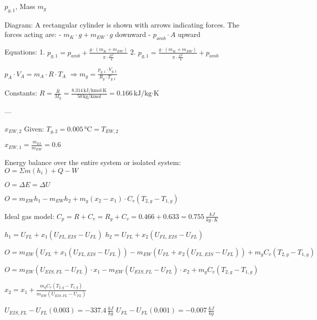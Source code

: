 \( p_{g,1} \), Mass \( m_g \)  

Diagram: A rectangular cylinder is shown with arrows indicating forces. The forces acting are:  
- \( m_K \cdot g + m_{EW} \cdot g \) downward  
- \( p_{amb} \cdot A \) upward  

Equations:  
1. \( p_{g,1} = p_{amb} + \frac{g \cdot (m_K + m_{EW})}{\pi \cdot \frac{D^2}{4}} \)  
2. \( p_{g,1} = \frac{g \cdot (m_K + m_{EW})}{\pi \cdot \frac{D^2}{4}} + p_{amb} \)  

\( p_A \cdot V_A = m_A \cdot R \cdot T_A \)  
\( \Rightarrow m_g = \frac{p_{g,1} \cdot V_{g,1}}{R_g \cdot T_{g,1}} \)  

Constants:  
\( R = \frac{\bar{R}}{M_g} = \frac{8.314 \, \text{kJ/kmol·K}}{50 \, \text{kg/kmol}} = 0.166 \, \text{kJ/kg·K} \)  

---

\( x_{EW,2} \)  
Given: \( T_{g,2} = 0.005 \, \text{°C} = T_{EW,2} \)  

\( x_{EW,1} = \frac{m_{EI}}{m_{EW}} = 0.6 \)  

Energy balance over the entire system or isolated system:  
\( O = \Sigma m (h_i) + Q - W \)  

\( O = \Delta E = \Delta U \)  

\( O = m_{EW} h_1 - m_{EW} h_2 + m_g \left( x_2 - x_1 \right) \cdot C_v \left( T_{2,g} - T_{1,g} \right) \)  

Ideal gas model:  
\( C_p = R + C_v = R_g + C_v = 0.466 + 0.633 = 0.755 \, \frac{kJ}{kg \cdot K} \)  

\( h_1 = U_{FL} + x_1 \left( U_{FL,EIS} - U_{FL} \right) \)  
\( h_2 = U_{FL} + x_2 \left( U_{FL,EIS} - U_{FL} \right) \)  

\( O = m_{EW} \left( U_{FL} + x_1 \left( U_{FL,EIS} - U_{FL} \right) \right) - m_{EW} \left( U_{FL} + x_2 \left( U_{FL,EIS} - U_{FL} \right) \right) + m_g C_v \left( T_{2,g} - T_{1,g} \right) \)  

\( O = m_{EW} \left( U_{EIS,FL} - U_{FL} \right) \cdot x_1 - m_{EW} \left( U_{EIS,FL} - U_{FL} \right) \cdot x_2 + m_g C_v \left( T_{2,g} - T_{1,g} \right) \)  

\( x_2 = x_1 + \frac{m_g C_v \left( T_{2,g} - T_{1,g} \right)}{m_{EW} \left( U_{EIS,FL} - U_{FL} \right)} \)  

\( U_{EIS,FL} - U_{FL} \left( 0.003 \right) = -337.4 \, \frac{kJ}{kg} \)  
\( U_{FL} - U_{FL} \left( 0.001 \right) = -0.007 \, \frac{kJ}{kg} \)